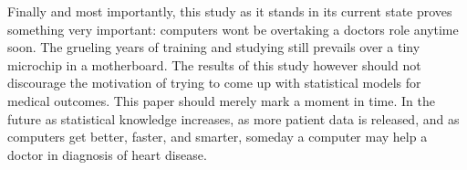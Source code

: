 \documentclass[12pt]{article}
\begin{document}
Finally and most importantly, this study as it stands in its current state proves something very important: computers won\textsc{}t be overtaking a doctor\textsc{}s role anytime soon. The grueling years of training and studying still prevails over a tiny microchip in a motherboard. The results of this study however should not discourage the motivation of trying to come up with statistical models for medical outcomes. This paper should merely mark a moment in time. In the future as statistical knowledge increases, as more patient data is released, and as computers get better, faster, and smarter, someday a computer may help a doctor in diagnosis of heart disease.




\end{document}
